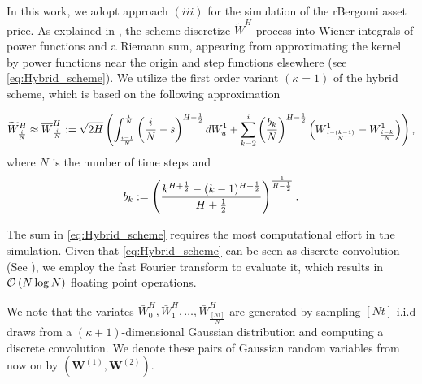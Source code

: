 In this work, we adopt approach  $(iii)$ for the simulation of the rBergomi asset price. As explained in \cite{bennedsen2017hybrid}, the scheme discretize $\widetilde{W}^H$ process into Wiener integrals of power functions and a Riemann sum, appearing from approximating the kernel by power functions near the origin and step functions elsewhere (see \eqref{eq:Hybrid_scheme}). We utilize the first order variant $(\kappa=1) $ of the hybrid scheme, which is based on the following approximation

\begin{equation}\label{eq:Hybrid_scheme}
\widetilde{W}^H_{\frac{i}{N}} \approx \overline{W}^H_{\frac{i}{N}}:= \sqrt{2H} \left(\int_{\frac{i-1}{N}}^{\frac{i}{N}} \left(\frac{i}{N} -s\right)^{H-\frac{1}{2}} dW_u^1+\sum_{k=2}^{i} \left(\frac{b_k}{N}\right)^{H-\frac{1}{2}} \left(W_{\frac{i-(k-1)}{N}}^1-W_{\frac{i-k}{N}}^1\right)\right) ,
\end{equation}
where $N$ is the number of time steps and 
$$ b_k:=\left(\frac{k^{H+\frac{1}{2}}-(k-1)^{H+\frac{1}{2} }}{H+\frac{1}{2}}\right)^{\frac{1}{H-\frac{1}{2}}} .$$

The sum in \eqref{eq:Hybrid_scheme} requires the most computational effort in the simulation. Given that \eqref{eq:Hybrid_scheme} can be seen as discrete convolution  (See \cite{bennedsen2017hybrid}), we employ the fast Fourier transform to evaluate it, which results in  ${\mathcal{O}}\left(N \log N\right)$ floating point operations.


We note that the variates $\bar{W}_0^{H},\bar{W}_1^{H},\dots,\bar{W}_{\frac{[Nt]}{N}}^{H}$ are  generated by sampling $[Nt]$ i.i.d draws from a $(\kappa+1)$-dimensional Gaussian distribution and computing a discrete convolution. We denote these pairs  of Gaussian random variables from now on by $(\mathbf{W}^{(1)},\mathbf{W}^{(2)})$.
